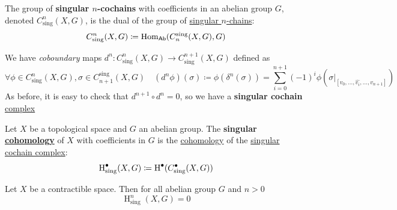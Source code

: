 \documentclass[../../main]{subfiles}
\begin{document}
\begin{definition}\label{def:singular-cochain}
  The group of \textbf{singular \(n\)-cochains} with coefficients in an abelian group \(G\), denoted \(C_{\operatorname{sing}}^{n}(X, G)\), is the dual of the group of \hyperref[def:singular-chain]{singular \(n\)-chains}:
  \begin{equation*}
    C_{\operatorname{sing}}^{n}(X, G) \coloneq \operatorname{Hom}_{\mathsf{Ab}}(C_{n}^{\operatorname{sing}}(X, G), G)
  \end{equation*}

  We have \textit{coboundary} maps \(d^{n}: C_{\operatorname{sing}}^{n}(X, G) \to C_{\operatorname{sing}}^{n+1}(X, G)\) defined as
  \begin{equation*}
    \forall \phi \in C_{\operatorname{sing}}^{n}(X, G), \sigma \in C_{n+1}^{\operatorname{sing}}(X, G) \quad (d^{n}\phi)(\sigma) \coloneq \phi(\delta^{n}(\sigma)) = \sum_{i=0}^{n+1} (-1)^{i}\phi(\sigma|_{[v_{0}, \ldots, \hat{v_{i}}, \ldots, v_{n+1}]})
  \end{equation*}
  As before, it is easy to check that \(d^{n+1} \circ d^{n} = 0\), so we have a \textbf{singular cochain} \hyperref[def:complex]{complex}
  \begin{center}
  \end{center}
\end{definition}

\begin{definition}\label{def:singular-cohomology}
  Let \(X\) be a topological space and \(G\) an abelian group.
  The \textbf{singular \hyperref[def:cohomology]{cohomology}} of \(X\) with coefficients in \(G\) is the \hyperref[def:cohomology]{cohomology} of the \hyperref[def:singular-cochain]{singular cochain complex}:
  \begin{equation*}
    \operatorname{H}_{\operatorname{sing}}^{\bullet}(X, G) \coloneq \operatorname{H}^{\bullet}(C_{\operatorname{sing}}^{\bullet}(X, G))
  \end{equation*}
\end{definition}

\begin{lemma}\label{lemma:singular-cohomology-contractible-space}
  Let \(X\) be a contractible space.
  Then for all abelian group \(G\) and \(n > 0\)
  \begin{equation*}
    \operatorname{H}_{\operatorname{sing}}^{n}(X, G) = 0
  \end{equation*}
\end{lemma}
\end{document}
